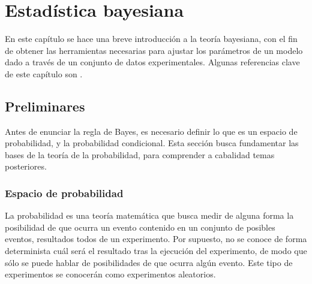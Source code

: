 \chapter{Estadística bayesiana}
En este capítulo se hace una breve introducción a la teoría bayesiana, con el fin de obtener las herramientas necesarias para ajustar los parámetros de un modelo dado a través de un conjunto de datos experimentales. Algunas referencias clave de este capítulo son \cite{Arunachalam,rossi_2018,speagle2019conceptual,kish_1995,brooks_gelman_jones_2011}.
\section{Preliminares}
Antes de enunciar la regla de Bayes, es necesario definir lo que es un espacio de probabilidad, y la probabilidad condicional. Esta sección busca fundamentar las bases de la teoría de la probabilidad, para comprender a cabalidad temas posteriores.
\subsection{Espacio de probabilidad}
La probabilidad es una teoría matemática que busca medir de alguna forma la posibilidad de que ocurra un evento contenido en un conjunto de posibles eventos, resultados todos de un experimento. Por supuesto, no se conoce de forma determinista cuál será el resultado tras la ejecución del experimento, de modo que sólo se puede hablar de posibilidades de que ocurra algún evento. Este tipo de experimentos se conocerán como experimentos aleatorios.

